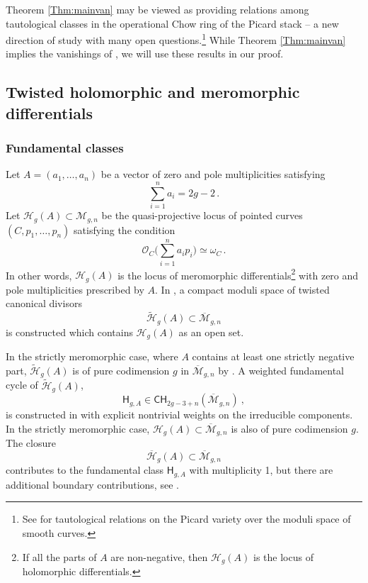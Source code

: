 \documentclass[a4paper,12pt]{article} %
\def\oM{\overline{\mathcal{M}}}
\def\HH{\mathcal{H}}
\theoremstyle{definition}
\theoremstyle{plain}%
\begin{document}
 



Theorem \ref{Thm:mainvan} may be viewed
as providing relations among
tautological classes in the operational
Chow ring of the Picard stack -- a new
direction of study with many open questions.{\footnote{See \cite{RandalWilliams2012,Yin}
for tautological relations on the Picard variety over
the moduli space of smooth curves.}}
While Theorem \ref{Thm:mainvan} 
implies the
vanishings of
\cite{Bae, cj}, 
we will use these results in our
proof. 


\subsection{Twisted holomorphic and meromorphic differentials} \label{Sect:Twistdiffintro}
\subsubsection{Fundamental classes}
Let $A=(a_1,\ldots,a_n)$ be a vector of zero and pole multiplicities
satisfying
$$\sum_{i=1}^n a_i= 2g-2\, .$$
Let $\HH_g(A) \subset \mathcal{M}_{g,n}$ be the quasi-projective locus 
of pointed curves $(C,p_1,\ldots,p_n)$ satisfying the condition
$$\mathcal{O}_C\Big(\sum_{i=1}^n a_i p_i\Big) \simeq \omega_C\, .$$
In other words, $\HH_g(A)$ is the locus of meromorphic differentials{\footnote{If all
the parts of $A$ are non-negative, then $\HH_g(A)$ is the locus of
holomorphic differentials.}}
with zero and pole multiplicities prescribed by $A$.
In \cite{Farkas2016The-moduli-spac}, a compact moduli space of twisted canonical divisors
$$\widetilde{\HH}_g(A) \subset \overline{\mathcal{M}}_{g,n}$$
is constructed which contains $\HH_g(A)$ as an open set.

In the strictly meromorphic
case, where $A$ contains at least one strictly negative part,
$\widetilde{\HH}_g(A)$ is of pure codimension $g$ in
$\overline{\mathcal{M}}_{g,n}$ by \cite[Theorem 3]{Farkas2016The-moduli-spac}. 
A weighted fundamental cycle of $\widetilde{\HH}_g(A)$, 
\begin{equation}\label{wwww4}
\mathsf{H}_{g,A}\in \mathsf{CH}_{2g-3+n}(\oM_{g,n})\ ,
\end{equation}
is constructed in
\cite[Appendix A]{Farkas2016The-moduli-spac} with explicit nontrivial 
weights on the irreducible components.
In the strictly meromorphic case,
$\HH_{g}(A)\subset \oM_{g,n}$ 
is also of pure codimension $g$.
The closure
$$\overline{\HH}_{g}(A)\subset \oM_{g,n}$$
contributes to the fundamental class $\mathsf{H}_{g,A}$ with
multiplicity 1, but there are additional boundary contributions, see
\cite[Appendix A]{Farkas2016The-moduli-spac}.
\end{document}
